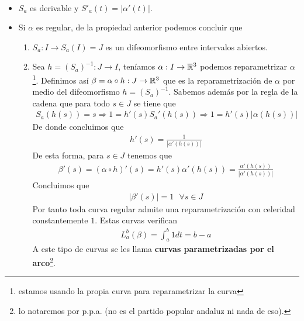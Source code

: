 \begin{propiedades}\
    \begin{itemize}
        \item $S_a$ es derivable y $S'_a(t) = |\alpha'(t)|$.
        \item Si $\alpha$ es regular, de la propiedad anterior podemos concluir que 
        \begin{enumerate}
            \item $S_a: I \to S_a(I)=J$ es un difeomorfismo entre intervalos abiertos.
            \item Sea $h=(S_a)^{-1} : J\to I$, teníamos $\alpha : I \to \mathbb{R}^3$ podemos reparametrizar $\alpha$\footnote{estamos usando la propia curva para reparametrizar la curva}. Definimos así $\beta = \alpha \circ h : J \to \mathbb{R}^3$ que es la reparametrización de $\alpha$ por medio del difeomorfismo $h = (S_a)^{-1}$. Sabemos además por la regla de la cadena que para todo $s \in J$ se tiene que
            \begin{gather*}
                S_a(h(s)) = s \Rightarrow 1 = h'(s)S_a'(h(s)) \Rightarrow 1 = h'(s)|\alpha(h(s))|
            \end{gather*}
            De donde concluimos que 
            \begin{gather*}
                h'(s) = \frac{1}{|\alpha'(h(s))|}
            \end{gather*}
            De esta forma, para $s\in J$ tenemos que
            \begin{gather*}
                \beta'(s) = (\alpha \circ h)'(s) = h'(s) \alpha'(h(s)) = \frac{\alpha'(h(s))}{|\alpha'(h(s))|}
            \end{gather*}
            Concluimos que 
            \begin{gather*}
                |\beta'(s)| = 1 \ \ \ \forall s \in J
            \end{gather*}
            Por tanto toda curva regular admite una reparametrización con celeridad constantemente $1$. Estas curvas verifican
            \begin{gather*}
                L_a^b(\beta) =  \int_a^b 1 dt = b-a
            \end{gather*}
            A este tipo de curvas se les llama \textbf{curvas parametrizadas por el arco}\footnote{lo notaremos por p.p.a. (no es el partido popular andaluz ni nada de eso).}.
        \end{enumerate}
    \end{itemize}
\end{propiedades}

